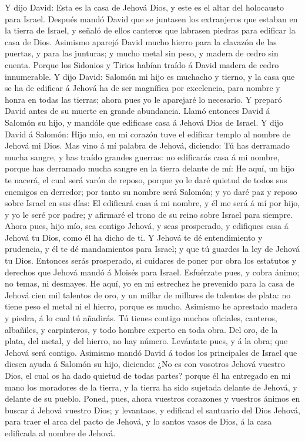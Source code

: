  Y dijo David: Esta es la casa de Jehová Dios, y este es el
altar del holocausto para Israel.  Después mandó David que
se juntasen los extranjeros que estaban en la tierra de Israel, y señaló
de ellos canteros que labrasen piedras para edificar la casa de Dios.
 Asimismo aparejó David mucho hierro para la clavazón de las
puertas, y para las junturas; y mucho metal sin peso, y madera de cedro
sin cuenta.  Porque los Sidonios y Tirios habían traído á
David madera de cedro innumerable.  Y dijo David: Salomón mi
hijo es muchacho y tierno, y la casa que se ha de edificar á Jehová ha
de ser magnífica por excelencia, para nombre y honra en todas las
tierras; ahora pues yo le aparejaré lo necesario. Y preparó David antes
de su muerte en grande abundancia.  Llamó entonces David á
Salomón su hijo, y mandóle que edificase casa á Jehová Dios de Israel.
 Y dijo David á Salomón: Hijo mío, en mi corazón tuve el
edificar templo al nombre de Jehová mi Dios.  Mas vino á mí
palabra de Jehová, diciendo: Tú has derramado mucha sangre, y has traído
grandes guerras: no edificarás casa á mi nombre, porque has derramado
mucha sangre en la tierra delante de mí:  He aquí, un hijo
te nacerá, el cual será varón de reposo, porque yo le daré quietud de
todos sus enemigos en derredor; por tanto su nombre será Salomón; y yo
daré paz y reposo sobre Israel en sus días:  El edificará
casa á mi nombre, y él me será á mí por hijo, y yo le seré por padre; y
afirmaré el trono de su reino sobre Israel para siempre. 
Ahora pues, hijo mío, sea contigo Jehová, y seas prosperado, y edifiques
casa á Jehová tu Dios, como él ha dicho de ti.  Y Jehová te
dé entendimiento y prudencia, y él te dé mandamientos para Israel; y que
tú guardes la ley de Jehová tu Dios.  Entonces serás
prosperado, si cuidares de poner por obra los estatutos y derechos que
Jehová mandó á Moisés para Israel. Esfuérzate pues, y cobra ánimo; no
temas, ni desmayes.  He aquí, yo en mi estrechez he
prevenido para la casa de Jehová cien mil talentos de oro, y un millar
de millares de talentos de plata: no tiene peso el metal ni el hierro,
porque es mucho. Asimismo he aprestado madera y piedra, á lo cual tú
añadirás.  Tú tienes contigo muchos oficiales, canteros,
albañiles, y carpinteros, y todo hombre experto en toda obra.
 Del oro, de la plata, del metal, y del hierro, no hay
número. Levántate pues, y á la obra; que Jehová será contigo.
 Asimismo mandó David á todos los principales de Israel que
diesen ayuda á Salomón su hijo, diciendo:  ¿No es con
vosotros Jehová vuestro Dios, el cual os ha dado quietud de todas
partes? porque él ha entregado en mi mano los moradores de la tierra, y
la tierra ha sido sujetada delante de Jehová, y delante de su pueblo.
 Poned, pues, ahora vuestros corazones y vuestros ánimos en
buscar á Jehová vuestro Dios; y levantaos, y edificad el santuario del
Dios Jehová, para traer el arca del pacto de Jehová, y lo santos vasos
de Dios, á la casa edificada al nombre de Jehová.

